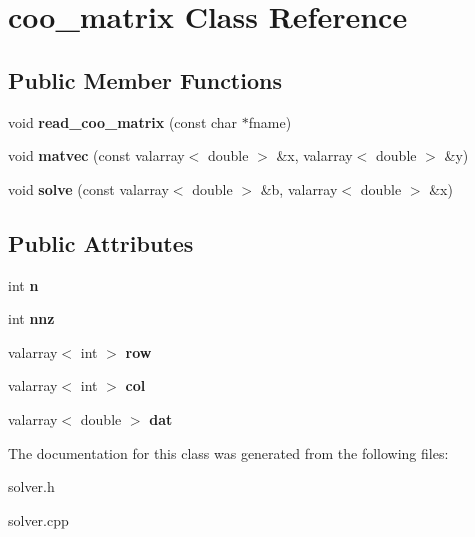 \hypertarget{classcoo__matrix}{}\section{coo\+\_\+matrix Class Reference}
\label{classcoo__matrix}
\subsection*{Public Member Functions}
\begin{DoxyCompactItemize}
\item 
void {\bfseries read\+\_\+coo\+\_\+matrix} (const char $\ast$fname)\hypertarget{classcoo__matrix_aca6aed56a99ab4664c8c0f5871606a10}{}\label{classcoo__matrix_aca6aed56a99ab4664c8c0f5871606a10}

\item 
void {\bfseries matvec} (const valarray$<$ double $>$ \&x, valarray$<$ double $>$ \&y)\hypertarget{classcoo__matrix_a650551ff097541e73d1fc89c0dd9694c}{}\label{classcoo__matrix_a650551ff097541e73d1fc89c0dd9694c}

\item 
void {\bfseries solve} (const valarray$<$ double $>$ \&b, valarray$<$ double $>$ \&x)\hypertarget{classcoo__matrix_ac0cf916f9fa1c07e774c37d41407245c}{}\label{classcoo__matrix_ac0cf916f9fa1c07e774c37d41407245c}

\end{DoxyCompactItemize}
\subsection*{Public Attributes}
\begin{DoxyCompactItemize}
\item 
int {\bfseries n}\hypertarget{classcoo__matrix_a6148ebf053576f70747dc3e260f25ea5}{}\label{classcoo__matrix_a6148ebf053576f70747dc3e260f25ea5}

\item 
int {\bfseries nnz}\hypertarget{classcoo__matrix_a52ecd103d6c673a7e26457d29055fb3c}{}\label{classcoo__matrix_a52ecd103d6c673a7e26457d29055fb3c}

\item 
valarray$<$ int $>$ {\bfseries row}\hypertarget{classcoo__matrix_ad1e40669007eeeedcad75eb5606df654}{}\label{classcoo__matrix_ad1e40669007eeeedcad75eb5606df654}

\item 
valarray$<$ int $>$ {\bfseries col}\hypertarget{classcoo__matrix_ae49b54893e4b096df04e9b6a5ce02923}{}\label{classcoo__matrix_ae49b54893e4b096df04e9b6a5ce02923}

\item 
valarray$<$ double $>$ {\bfseries dat}\hypertarget{classcoo__matrix_ab819a816424fa585d028739b5318959a}{}\label{classcoo__matrix_ab819a816424fa585d028739b5318959a}

\end{DoxyCompactItemize}


The documentation for this class was generated from the following files\+:\begin{DoxyCompactItemize}
\item 
solver.\+h\item 
solver.\+cpp\end{DoxyCompactItemize}
